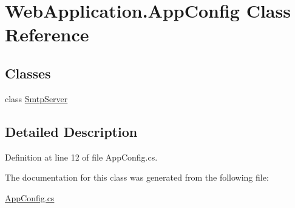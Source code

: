 \hypertarget{classWebApplication_1_1AppConfig}{}\section{Web\+Application.\+App\+Config Class Reference}
\label{classWebApplication_1_1AppConfig}
\subsection*{Classes}
\begin{DoxyCompactItemize}
\item 
class \mbox{\hyperlink{classWebApplication_1_1AppConfig_1_1SmtpServer}{Smtp\+Server}}
\end{DoxyCompactItemize}


\subsection{Detailed Description}


Definition at line 12 of file App\+Config.\+cs.



The documentation for this class was generated from the following file\+:\begin{DoxyCompactItemize}
\item 
\mbox{\hyperlink{AppConfig_8cs}{App\+Config.\+cs}}\end{DoxyCompactItemize}
